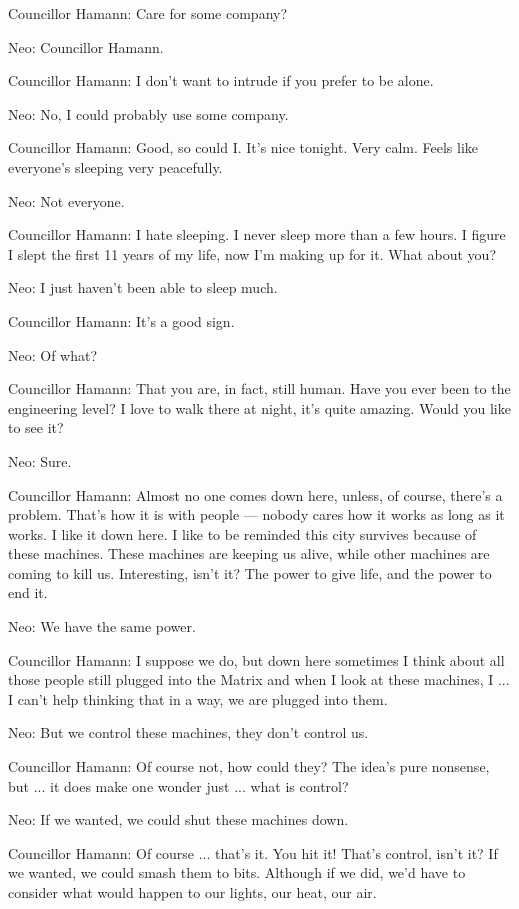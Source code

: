 \documentclass{ctexart}
\newenvironment{myquote}{\color{green} \setlength{\leftskip}{6em} \setlength{\rightskip}{4em} \setlength{\parindent}{-2em}}{\par}
\begin{document}
\begin{myquote}
Councillor Hamann: Care for some company?

Neo: Councillor Hamann.

Councillor Hamann: I don't want to intrude if you prefer to be alone.

Neo: No, I could probably use some company.

Councillor Hamann: Good, so could I. It's nice tonight. Very calm. Feels like everyone's sleeping very peacefully.

Neo: Not everyone.

Councillor Hamann: I hate sleeping. I never sleep more than a few hours. I figure I slept the first 11 years of my life, now I'm making up for it. What about you?

Neo: I just haven't been able to sleep much.

Councillor Hamann: It's a good sign.

Neo: Of what?

Councillor Hamann: That you are, in fact, still human. Have you ever been to the engineering level? I love to walk there at night, it's quite amazing. Would you like to see it?

Neo: Sure.

Councillor Hamann: Almost no one comes down here, unless, of course, there's a problem. That's how it is with people --- nobody cares how it works as long as it works. I like it down here. I like to be reminded this city survives because of these machines. These machines are keeping us alive, while other machines are coming to kill us. Interesting, isn't it? The power to give life, and the power to end it.

Neo: We have the same power.

Councillor Hamann: I suppose we do, but down here sometimes I think about all those people still plugged into the Matrix and when I look at these machines, I ... I can't help thinking that in a way, we are plugged into them.

Neo: But we control these machines, they don't control us.

Councillor Hamann: Of course not, how could they? The idea's pure nonsense, but ... it does make one wonder just ... what is control?

Neo: If we wanted, we could shut these machines down.

Councillor Hamann: Of course ... that's it. You hit it! That's control, isn't it? If we wanted, we could smash them to bits. Although if we did, we'd have to consider what would happen to our lights, our heat, our air.


\end{myquote}
\end{document}
